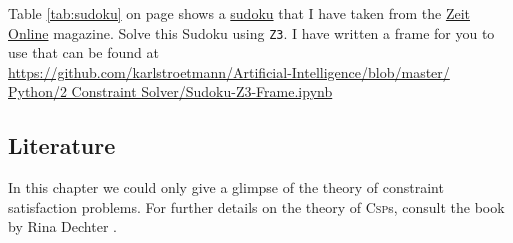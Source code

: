 \exercise
{}
Table \ref{tab:sudoku} on page \pageref{tab:sudoku} shows a \href{https://en.wikipedia.org/wiki/Sudoku}{sudoku}
that I have taken from the
\href{http://sudoku.zeit.de/cgi-bin/sudoku/sudoku_kd_app_2016.pl?action=level&kd_nr=24091123601092&year=2018&month=03&day=23&level=-c+5}{Zeit Online}
magazine.
Solve this Sudoku using \texttt{Z3}.  I have written a frame for you to use that can be found at
\\[0.2cm]
\hspace*{1.3cm}
\href{https://github.com/karlstroetmann/Artificial-Intelligence/blob/master/Python/2 Constraint
  Solver/Sudoku-Z3-Frame.ipynb}{https://github.com/karlstroetmann/Artificial-Intelligence/blob/master/\\
      \hspace*{2.6cm}  
          Python/2 Constraint Solver/Sudoku-Z3-Frame.ipynb}
    \eox
\pagebreak
    
\subsection{Literature}    
In this chapter we could only give a glimpse of the theory of constraint satisfaction problems.
For further details on the theory of \textsc{Csp}s, consult the book  by Rina Dechter
\cite{dechter:2003}.



